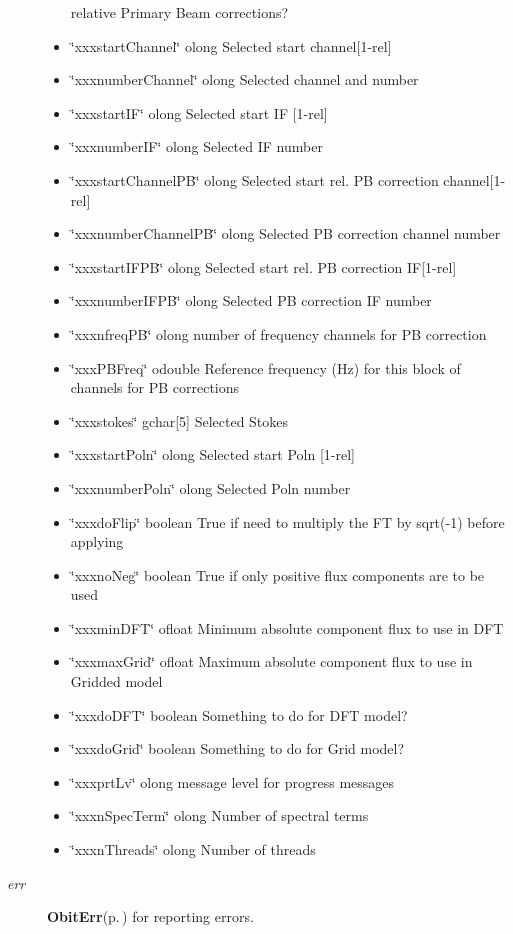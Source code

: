 \begin{Desc}
\begin{description}
\begin{itemize}
relative Primary Beam corrections? \item \char`\"{}xxxstart\-Channel\char`\"{} olong Selected start channel[1-rel] \item \char`\"{}xxxnumber\-Channel\char`\"{} olong Selected channel and number \item \char`\"{}xxxstart\-IF\char`\"{} olong Selected start IF [1-rel] \item \char`\"{}xxxnumber\-IF\char`\"{} olong Selected IF number \item \char`\"{}xxxstart\-Channel\-PB\char`\"{} olong Selected start rel. PB correction channel[1-rel] \item \char`\"{}xxxnumber\-Channel\-PB\char`\"{} olong Selected PB correction channel number \item \char`\"{}xxxstart\-IFPB\char`\"{} olong Selected start rel. PB correction IF[1-rel] \item \char`\"{}xxxnumber\-IFPB\char`\"{} olong Selected PB correction IF number \item \char`\"{}xxxnfreq\-PB\char`\"{} olong number of frequency channels for PB correction \item \char`\"{}xxx\-PBFreq\char`\"{} odouble Reference frequency (Hz) for this block of channels for PB corrections \item \char`\"{}xxxstokes\char`\"{} gchar[5] Selected Stokes \item \char`\"{}xxxstart\-Poln\char`\"{} olong Selected start Poln [1-rel] \item \char`\"{}xxxnumber\-Poln\char`\"{} olong Selected Poln number \item \char`\"{}xxxdo\-Flip\char`\"{} boolean True if need to multiply the FT by sqrt(-1) before applying \item \char`\"{}xxxno\-Neg\char`\"{} boolean True if only positive flux components are to be used \item \char`\"{}xxxmin\-DFT\char`\"{} ofloat Minimum absolute component flux to use in DFT \item \char`\"{}xxxmax\-Grid\char`\"{} ofloat Maximum absolute component flux to use in Gridded model \item \char`\"{}xxxdo\-DFT\char`\"{} boolean Something to do for DFT model? \item \char`\"{}xxxdo\-Grid\char`\"{} boolean Something to do for Grid model? \item \char`\"{}xxxprt\-Lv\char`\"{} olong message level for progress messages \item \char`\"{}xxxn\-Spec\-Term\char`\"{} olong Number of spectral terms \item \char`\"{}xxxn\-Threads\char`\"{} olong Number of threads \end{itemize}
\item[{\em err}]{\bf Obit\-Err}{\rm (p.\,\pageref{structObitErr})} for reporting errors. \end{description}
\end{Desc}
